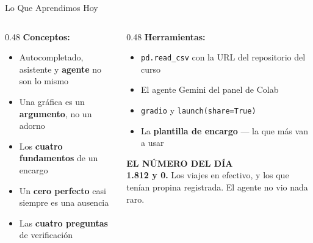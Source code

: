\documentclass[aspectratio=169, 11pt]{beamer}
\begin{document}
\begin{frame}[shrink=8]{Lo Que Aprendimos Hoy}
  \vspace{-2pt}
  \begin{columns}[T]
    \begin{column}{0.48\textwidth}
      {\small\color{arcaDark}\bfseries\faLightbulb[regular]\hspace{5pt}Conceptos:}
      \vspace{4pt}
      {\footnotesize\color{textMuted}
      \begin{itemize}\setlength{\itemsep}{3pt}
        \item[{\color{codeGreen}\scriptsize\faCheck}]
          Autocompletado, asistente y \textbf{agente} no son lo mismo
        \item[{\color{codeGreen}\scriptsize\faCheck}]
          Una gráfica es un \textbf{argumento}, no un adorno
        \item[{\color{codeGreen}\scriptsize\faCheck}]
          Los \textbf{cuatro fundamentos} de un encargo
        \item[{\color{codeGreen}\scriptsize\faCheck}]
          Un \textbf{cero perfecto} casi siempre es una ausencia
        \item[{\color{codeGreen}\scriptsize\faCheck}]
          Las \textbf{cuatro preguntas} de verificación
      \end{itemize}}
    \end{column}
    \begin{column}{0.48\textwidth}
      {\small\color{arcaDark}\bfseries\faTools\hspace{5pt}Herramientas:}
      \vspace{4pt}
      {\footnotesize\color{textMuted}
      \begin{itemize}\setlength{\itemsep}{3pt}
        \item[{\color{arcaRed}\scriptsize\faArrowRight}]
          \texttt{pd.read\_csv} con la URL del repositorio del curso
        \item[{\color{arcaRed}\scriptsize\faArrowRight}]
          El agente Gemini del panel de Colab
        \item[{\color{arcaRed}\scriptsize\faArrowRight}]
          \texttt{gradio} y \texttt{launch(share=True)}
        \item[{\color{arcaRed}\scriptsize\faArrowRight}]
          La \textbf{plantilla de encargo} --- la que más van a usar
      \end{itemize}}
      \vspace{5pt}
      \begin{tcolorbox}[colback=arcaGray, colframe=arcaRed, boxrule=0pt, leftrule=3pt,
        arc=3pt, left=6pt, right=6pt, top=4pt, bottom=4pt]
        {\scriptsize\color{arcaRed}\bfseries EL NÚMERO DEL DÍA}\\[3pt]
        {\scriptsize\color{textMuted}
         \textbf{1.812 y 0.} Los viajes en efectivo, y los que tenían
         propina registrada. El agente no vio nada raro.}
      \end{tcolorbox}
    \end{column}
  \end{columns}
\end{frame}
\end{document}
